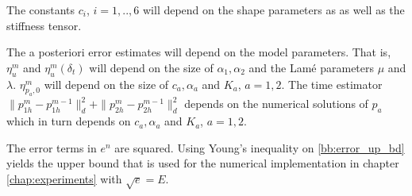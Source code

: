 \begin{remark}
The constants $c_i$, $i=1,..,6$ will depend on the shape parameters as as well as the stiffness tensor. 
\end{remark}
\begin{remark}
The a posteriori error estimates will depend on the model parameters. That is, $\eta^m_u$ and $\eta^m_u(\delta_t)$ will depend on the size of $\alpha_1, \alpha_2$ and the Lamé parameters $\mu$ and $\lambda$. $\eta^m_{p_a,0}$  will depend on the size of $c_a, \alpha_a$ and $K_a$, $a=1,2$. The time estimator $ \|p^m_{1h} - p^{m-1}_{1h}\|_d^2 + \|p^m_{2h} - p^{m-1}_{2h}\|_d^2$ depends on the numerical solutions of $p_a$ which in turn depends on $c_a, \alpha_a$ and $K_a$, $a=1,2$.
\end{remark}
\begin{remark}
The error terms in $e^n$ are squared. Using Young's inequality on \eqref{bb:error_up_bd} yields the upper bound that is used for the numerical implementation in chapter \ref{chap:experiments} with $\sqrt{e}=E$.
\end{remark}
